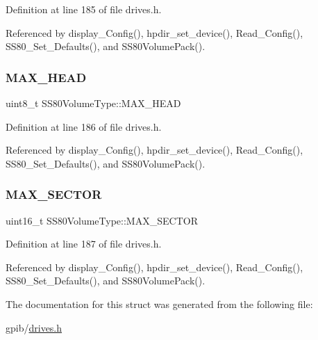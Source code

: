 Definition at line 185 of file drives.\+h.



Referenced by display\+\_\+\+Config(), hpdir\+\_\+set\+\_\+device(), Read\+\_\+\+Config(), S\+S80\+\_\+\+Set\+\_\+\+Defaults(), and S\+S80\+Volume\+Pack().

\mbox{\label{structSS80VolumeType_acc2870eb0a52a0e7f4dc57f036d903b1}} 
\subsubsection{\texorpdfstring{M\+A\+X\+\_\+\+H\+E\+AD}{MAX\_HEAD}}
{\footnotesize\ttfamily uint8\+\_\+t S\+S80\+Volume\+Type\+::\+M\+A\+X\+\_\+\+H\+E\+AD}



Definition at line 186 of file drives.\+h.



Referenced by display\+\_\+\+Config(), hpdir\+\_\+set\+\_\+device(), Read\+\_\+\+Config(), S\+S80\+\_\+\+Set\+\_\+\+Defaults(), and S\+S80\+Volume\+Pack().

\mbox{\label{structSS80VolumeType_a0a367b3bf05801cdee9dadc8324a3bdb}} 
\subsubsection{\texorpdfstring{M\+A\+X\+\_\+\+S\+E\+C\+T\+OR}{MAX\_SECTOR}}
{\footnotesize\ttfamily uint16\+\_\+t S\+S80\+Volume\+Type\+::\+M\+A\+X\+\_\+\+S\+E\+C\+T\+OR}



Definition at line 187 of file drives.\+h.



Referenced by display\+\_\+\+Config(), hpdir\+\_\+set\+\_\+device(), Read\+\_\+\+Config(), S\+S80\+\_\+\+Set\+\_\+\+Defaults(), and S\+S80\+Volume\+Pack().



The documentation for this struct was generated from the following file\+:\begin{DoxyCompactItemize}
\item 
gpib/\hyperlink{drives_8h}{drives.\+h}\end{DoxyCompactItemize}
